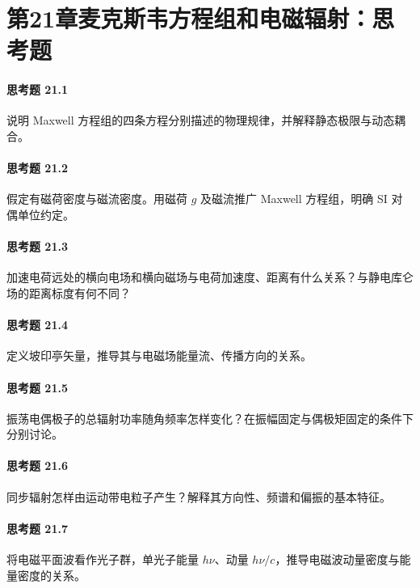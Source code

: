 \section*{第21章\quad 麦克斯韦方程组和电磁辐射：思考题}
\paragraph{思考题 21.1}
说明 Maxwell 方程组的四条方程分别描述的物理规律，并解释静态极限与动态耦合。

\paragraph{思考题 21.2}
假定有磁荷密度与磁流密度。用磁荷 \(g\) 及磁流推广 Maxwell 方程组，明确 SI 对偶单位约定。

\paragraph{思考题 21.3}
加速电荷远处的横向电场和横向磁场与电荷加速度、距离有什么关系？与静电库仑场的距离标度有何不同？

\paragraph{思考题 21.4}
定义坡印亭矢量，推导其与电磁场能量流、传播方向的关系。

\paragraph{思考题 21.5}
振荡电偶极子的总辐射功率随角频率怎样变化？在振幅固定与偶极矩固定的条件下分别讨论。

\paragraph{思考题 21.6}
同步辐射怎样由运动带电粒子产生？解释其方向性、频谱和偏振的基本特征。

\paragraph{思考题 21.7}
将电磁平面波看作光子群，单光子能量 \(h\nu\)、动量 \(h\nu/c\)，推导电磁波动量密度与能量密度的关系。
